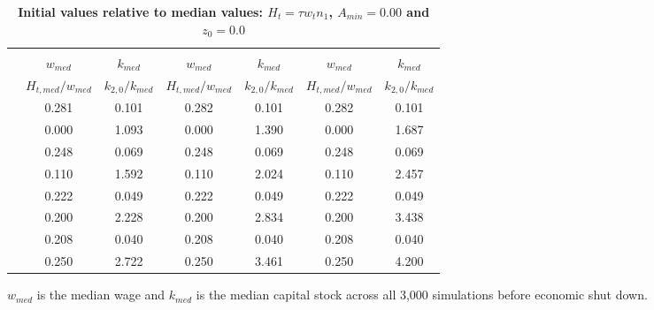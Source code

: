 \documentclass[letterpaper,12pt]{article}
\theoremstyle{definition}
\begin{document}
\begin{spacing}{1.5}
  \begin{table}[htbp]\centering\captionsetup{width=6.0in}
  \caption{\label{TabInitVal_tA0}\textbf{Initial values relative to median values: $H_t = \tau w_t n_1$, $A_{min}=0.00$ and $z_0=0.0$}}
    \begin{threeparttable}
    \begin{tabular}{>{\small}c| >{\small}c >{\small}c| >{\small}c >{\small}c| >{\small}c >{\small}c}
      \hline\hline
      & \multicolumn{2}{c}{$k_{2,0}=0.11$} & \multicolumn{2}{c}{$k_{2,0}=0.14$} & \multicolumn{2}{c}{$k_{2,0}=0.17$} \\ \cline{2-7}
      & $w_{med}$ & $k_{med}$ & $w_{med}$ & $k_{med}$ & $w_{med}$ & $k_{med}$ \\
      & $H_{t,med}/w_{med}$ & $k_{2,0}/k_{med}$ & $H_{t,med}/w_{med}$ & $k_{2,0}/k_{med}$ & $H_{t,med}/w_{med}$ & $k_{2,0}/k_{med}$ \\
      \hline
      \multirow{2}{*}{$\tau=0.00$}
      & 0.281 & 0.101 & 0.282 & 0.101 & 0.282 & 0.101 \\
      & 0.000 & 1.093 & 0.000 & 1.390 & 0.000 & 1.687 \\
      \hline
      \multirow{2}{*}{$\tau=0.11$}
      & 0.248 & 0.069 & 0.248 & 0.069 & 0.248 & 0.069 \\
      & 0.110 & 1.592 & 0.110 & 2.024 & 0.110 & 2.457 \\
      \hline
      \multirow{2}{*}{$\tau=0.20$}
      & 0.222 & 0.049 & 0.222 & 0.049 & 0.222 & 0.049 \\
      & 0.200 & 2.228 & 0.200 & 2.834 & 0.200 & 3.438 \\
      \hline
      \multirow{2}{*}{$\tau=0.25$}
      & 0.208 & 0.040 & 0.208 & 0.040 & 0.208 & 0.040 \\
      & 0.250 & 2.722 & 0.250 & 3.461 & 0.250 & 4.200 \\
      \hline\hline
    \end{tabular}
    \begin{tablenotes}
      \scriptsize{\item[]$w_{med}$ is the median wage and $k_{med}$ is the median capital stock across all 3,000 simulations before economic shut down.}
    \end{tablenotes}
    \end{threeparttable}
  \end{table}


\end{spacing}
\end{document}
